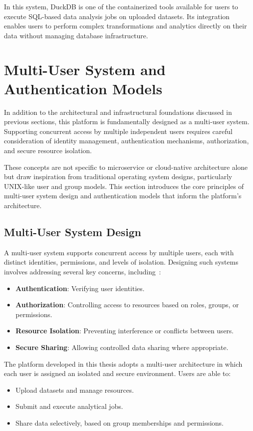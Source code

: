 In this system, DuckDB is one of the containerized tools available for users to execute SQL-based data analysis jobs on uploaded datasets. 
Its integration enables users to perform complex transformations and analytics directly on their data without managing database 
infrastructure.

\section{Multi-User System and Authentication Models}

In addition to the architectural and infrastructural foundations discussed in previous sections, this platform is fundamentally designed as a multi-user system. Supporting concurrent access by multiple independent users requires careful consideration of identity management, authentication mechanisms, authorization, and secure resource isolation.

These concepts are not specific to microservice or cloud-native architecture alone but draw inspiration from traditional operating system designs, particularly UNIX-like user and group models. This section introduces the core principles of multi-user system design and authentication models that inform the platform’s architecture.

\subsection{Multi-User System Design}

A multi-user system supports concurrent access by multiple users, each with distinct identities, permissions, and levels of isolation. Designing such systems involves addressing several key concerns, including~\cite{tanenbaum-os}:
\begin{itemize}
    \item \textbf{Authentication}: Verifying user identities.
    \item \textbf{Authorization}: Controlling access to resources based on roles, groups, or permissions.
    \item \textbf{Resource Isolation}: Preventing interference or conflicts between users.
    \item \textbf{Secure Sharing}: Allowing controlled data sharing where appropriate.
\end{itemize}

The platform developed in this thesis adopts a multi-user architecture in which each user is assigned an isolated and secure environment. Users are able to:
\begin{itemize}
    \item Upload datasets and manage resources.
    \item Submit and execute analytical jobs.
    \item Share data selectively, based on group memberships and permissions.
\end{itemize}

